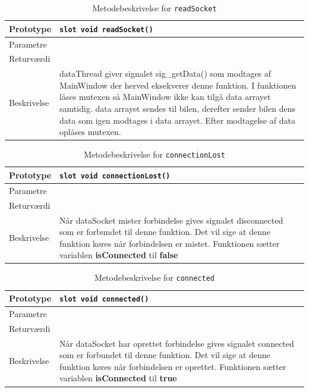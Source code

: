 \begin{table}[H]
\begin{tabularx}{\textwidth}{| L{2.5 cm} | Z |} \hline
Prototype & \texttt{slot void readSocket()} \\\hline
Parametre &   \\\hline
Returværdi &  \\\hline
Beskrivelse & dataThread giver signalet sig\_getData() som modtages af MainWindow der herved eksekverer denne funktion. I funktionen låses mutexen så MainWindow ikke kan tilgå data arrayet samtidig. data arrayet sendes til bilen, derefter sender bilen dens data som igen modtages i data arrayet. Efter modtagelse af data oplåses mutexen. \\\hline
\end{tabularx}
\caption{Metodebeskrivelse for \texttt{readSocket}}
\label{table:met_readSocket}
\end{table}

\begin{table}[H]
\begin{tabularx}{\textwidth}{| L{2.5 cm} | Z |} \hline
Prototype & \texttt{slot void connectionLost()} \\\hline
Parametre &   \\\hline
Returværdi &  \\\hline
Beskrivelse & Når dataSocket mister forbindelse gives signalet disconnected som er forbundet til denne funktion. Det vil sige at denne funktion køres når forbindelsen er mistet. Funktionen sætter variablen \textbf{isConnected} til \textbf{false}  \\\hline
\end{tabularx}
\caption{Metodebeskrivelse for \texttt{connectionLost}}
\label{table:met_connectionLost}
\end{table}

\begin{table}[H]
\begin{tabularx}{\textwidth}{| L{2.5 cm} | Z |} \hline
Prototype & \texttt{slot void connected()} \\\hline
Parametre &   \\\hline
Returværdi &  \\\hline
Beskrivelse & Når dataSocket har oprettet forbindelse gives signalet connected som er forbundet til denne funktion. Det vil sige at denne funktion køres når forbindelsen er oprettet. Funktionen sætter variablen \textbf{isConnected} til \textbf{true}  \\\hline
\end{tabularx}
\caption{Metodebeskrivelse for \texttt{connected}}
\label{table:met_connected}
\end{table}


